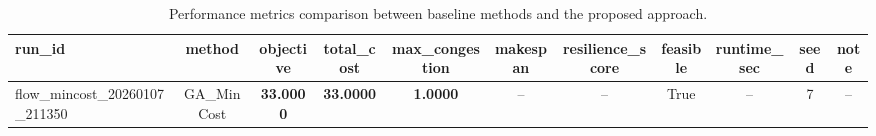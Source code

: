 \begin{table}[htbp]
\centering
\begin{tabular}{lcccccccccc}
\toprule
run_id & method & objective & total_cost & max_congestion & makespan & resilience_score & feasible & runtime_sec & seed & note \\
\midrule
flow_mincost_20260107_211350 & GA_MinCost & \textbf{33.0000} & \textbf{33.0000} & \textbf{1.0000} & -- & -- & True & -- & 7 & -- \\
\bottomrule
\end{tabular}
\caption{Performance metrics comparison between baseline methods and the proposed approach.}
\label{tab:metrics}
\end{table}
